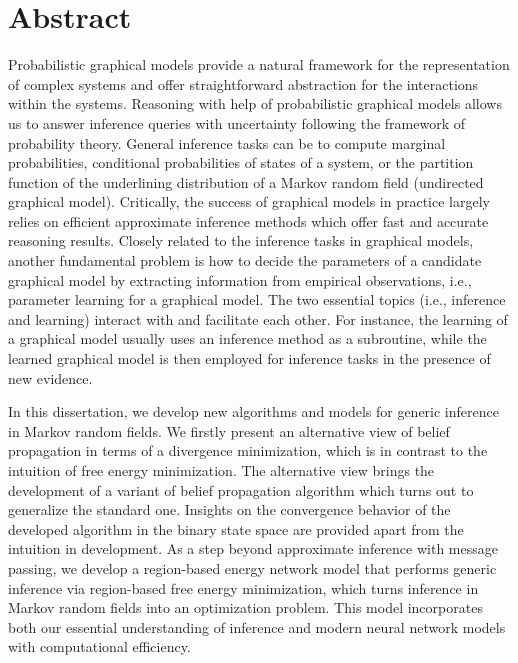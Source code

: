 \chapter{Abstract}
Probabilistic graphical models provide a natural framework for the representation of complex systems and offer straightforward abstraction for the interactions within the systems. Reasoning with help of probabilistic graphical models allows us to answer inference queries with uncertainty following the framework of probability theory. General inference tasks can be to compute marginal probabilities, conditional probabilities of states of a system, or the partition function of the underlining distribution of a Markov random field (undirected graphical model). Critically, the success of graphical models in practice largely relies on efficient approximate inference methods which offer fast and accurate reasoning results. Closely related to the inference tasks in graphical models, another fundamental problem is how to decide the parameters of a candidate graphical model by extracting information from empirical observations, i.e., parameter learning for a graphical model. The two essential topics (i.e., inference and learning) interact with and facilitate each other. For instance, the learning of a graphical model usually uses an inference method as a subroutine, while the learned graphical model is then employed for inference tasks in the presence of new evidence.

In this dissertation, we develop new algorithms and models for generic inference in Markov random fields. We firstly present an alternative view of belief propagation in terms of a divergence minimization, which is in contrast to the intuition of free energy minimization. The alternative view brings the development of a variant of belief propagation algorithm which turns out to generalize the standard one. Insights on the convergence behavior of the developed algorithm in the binary state space are provided apart from the intuition in development. As a step beyond approximate inference with message passing, we develop a region-based energy network model that performs generic inference via region-based free energy minimization, which turns inference in Markov random fields into an optimization problem. This model incorporates both our essential understanding of inference and modern neural network models with computational efficiency.

